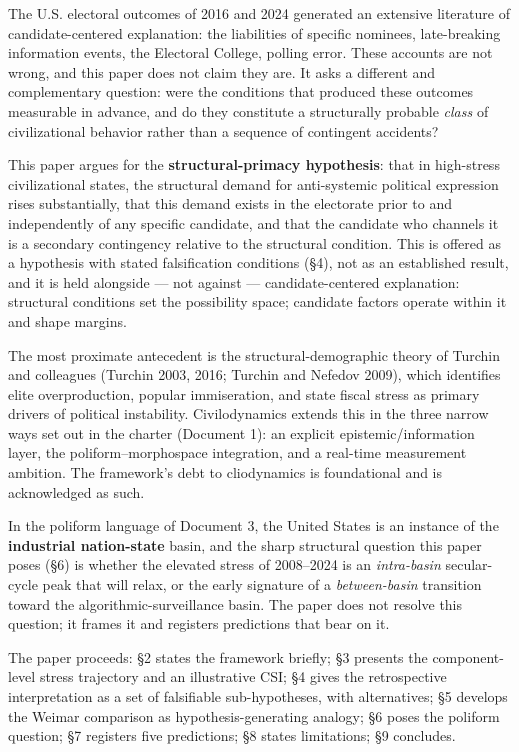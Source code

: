 \documentclass[
]{article}
\begin{document}
The U.S. electoral outcomes of 2016 and 2024 generated an extensive
literature of candidate-centered explanation: the liabilities of
specific nominees, late-breaking information events, the Electoral
College, polling error. These accounts are not wrong, and this paper
does not claim they are. It asks a different and complementary question:
were the conditions that produced these outcomes measurable in advance,
and do they constitute a structurally probable \emph{class} of
civilizational behavior rather than a sequence of contingent accidents?

This paper argues for the \textbf{structural-primacy hypothesis}: that
in high-stress civilizational states, the structural demand for
anti-systemic political expression rises substantially, that this demand
exists in the electorate prior to and independently of any specific
candidate, and that the candidate who channels it is a secondary
contingency relative to the structural condition. This is offered as a
hypothesis with stated falsification conditions (§4), not as an
established result, and it is held alongside --- not against ---
candidate-centered explanation: structural conditions set the
possibility space; candidate factors operate within it and shape
margins.

The most proximate antecedent is the structural-demographic theory of
Turchin and colleagues (Turchin 2003, 2016; Turchin and Nefedov 2009),
which identifies elite overproduction, popular immiseration, and state
fiscal stress as primary drivers of political instability.
Civilodynamics extends this in the three narrow ways set out in the
charter (Document 1): an explicit epistemic/information layer, the
poliform--morphospace integration, and a real-time measurement ambition.
The framework's debt to cliodynamics is foundational and is acknowledged
as such.

In the poliform language of Document 3, the United States is an instance
of the \textbf{industrial nation-state} basin, and the sharp structural
question this paper poses (§6) is whether the elevated stress of
2008--2024 is an \emph{intra-basin} secular-cycle peak that will relax,
or the early signature of a \emph{between-basin} transition toward the
algorithmic-surveillance basin. The paper does not resolve this
question; it frames it and registers predictions that bear on it.

The paper proceeds: §2 states the framework briefly; §3 presents the
component-level stress trajectory and an illustrative CSI; §4 gives the
retrospective interpretation as a set of falsifiable sub-hypotheses,
with alternatives; §5 develops the Weimar comparison as
hypothesis-generating analogy; §6 poses the poliform question; §7
registers five predictions; §8 states limitations; §9 concludes.
\end{document}
